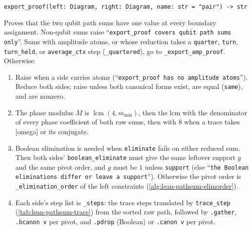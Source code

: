 \begin{signature}
\textnormal{\texttt{export\_\allowbreak{}proof(\allowbreak{}left: Diagram,\allowbreak{} right: Diagram,\allowbreak{} name: str = "pair") -{}> str}}
\end{signature}
\noindent Proves that the two qubit path sums have one value at every boundary assignment.
Non-qubit sums raise ``\texttt{export\_proof covers qubit path sums only}''. Sums with amplitude
atoms, or whose reduction takes a \textnormal{\texttt{quarter}}, \textnormal{\texttt{turn}}, \textnormal{\texttt{turn\_\allowbreak{}held}}, or \textnormal{\texttt{average\_\allowbreak{}ctx}}
step (\textnormal{\texttt{\_\allowbreak{}quartered}}), go to \textnormal{\texttt{\_\allowbreak{}export\_\allowbreak{}amp\_\allowbreak{}proof}}. Otherwise:

\begin{algorithm}[\textnormal{\texttt{\_\allowbreak{}plan(\allowbreak{}raw\_\allowbreak{}l,\allowbreak{} raw\_\allowbreak{}r,\allowbreak{} m\_\allowbreak{}min=1,\allowbreak{} support=False)}}]\label{alg:lean-pathsum-plan}
\begin{enumerate}
\item Raise when a side carries atoms (``\texttt{export\_proof has no amplitude atoms}''). Reduce
  both sides; raise unless both canonical forms exist, are equal (\textnormal{\texttt{same}}), and are nonzero.
\item The phase modulus $M$ is $\operatorname{lcm}(4, m_{\min})$, then the lcm with the
  denominator of every phase coefficient of both raw sums, then with $8$ when a trace takes
  [omega] or its conjugate.
\item Boolean elimination is needed when \textnormal{\texttt{eliminate}} fails on either reduced sum. Then both
  sides' \textnormal{\texttt{boolean\_\allowbreak{}eliminate}} must give the same leftover support $g$ and the same pivot order,
  and $g$ must be $1$ unless \textnormal{\texttt{support}} (else ``\texttt{the Boolean eliminations differ or leave a
  support}''). Otherwise the pivot order is \textnormal{\texttt{\_\allowbreak{}elimination\_\allowbreak{}order}} of the left constraints
  (\cref{alg:lean-pathsum-elimorder}).
\item Each side's step list is \textnormal{\texttt{\_\allowbreak{}steps}}: the trace steps translated by \textnormal{\texttt{trace\_\allowbreak{}step}}
  (\cref{tab:lean-pathsum-trace}) from the sorted raw path, followed by
  \textnormal{\texttt{.\allowbreak{}gather}}, \textnormal{\texttt{.\allowbreak{}bcanon v}} per pivot, and \textnormal{\texttt{.\allowbreak{}pdrop}} (Boolean) or \textnormal{\texttt{.\allowbreak{}canon v}} per
  pivot.
\end{enumerate}
\end{algorithm}

